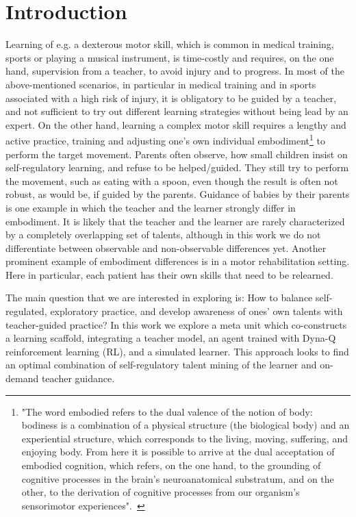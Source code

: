 \documentclass{article}
\begin{document}
\section{Introduction}
Learning of e.g. a dexterous motor skill,  which is common in medical
training, sports or playing a musical instrument, is time-costly and
requires, on the one hand, supervision from a teacher,  to avoid injury and to progress. In most of the above-mentioned scenarios, in particular in medical training and in sports associated with a high risk of injury, it is obligatory to be guided by a teacher, and not sufficient to try out different learning strategies without being lead by an expert. 
 On the other hand,  learning a complex 
motor skill requires a lengthy and active practice, training and adjusting one's own individual
embodiment\footnote{"The word embodied refers to the dual valence of the
notion of body: bodiness is a combination of a physical
structure (the biological body) and an experiential
structure, which corresponds to the living, moving,
suffering, and enjoying body. From here it is possible
to arrive at the dual acceptation of embodied cognition,
which refers, on the one hand, to the grounding of
cognitive processes in the brain’s neuroanatomical
substratum, and on the other, to the derivation of
cognitive processes from our organism’s sensorimotor
experiences".~\cite{encyclopedia}} to perform the target movement.   
Parents often observe, how small children insist on self-regulatory learning, and refuse to be helped/guided. They still try to perform the movement,  such as  eating with a spoon, even though the result is often not robust,  as would be, if guided  by the parents. Guidance of babies by their parents  is one example in which the teacher and the learner strongly differ in embodiment.  It is likely that the teacher and the learner are rarely characterized by a completely overlapping set of talents, although in this work we do not differentiate between observable and non-observable differences yet.  Another prominent example of embodiment differences is in a motor rehabilitation setting. Here in particular, each patient has their own skills that need to be relearned. 

The main  question  that we are
interested in exploring is: How to balance self-regulated,  exploratory practice, and develop awareness of ones' own talents  with teacher-guided practice? 
In this work we explore a meta unit which co-constructs a learning scaffold, integrating  a teacher model, an agent trained with Dyna-Q reinforcement learning (RL), and a  simulated learner.  This approach looks to find an optimal combination of self-regulatory talent mining of the learner and on-demand teacher guidance. 
\end{document}
